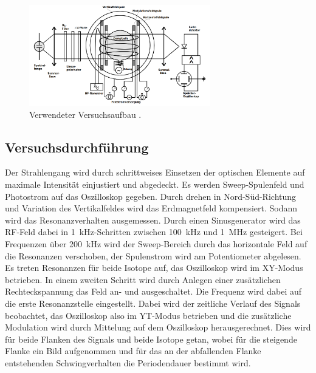 \begin{figure}[H]
  \centering
  \includegraphics[width=0.7\textwidth]{content/pics/Aufbau.png}
  \caption{Verwendeter Versuchsaufbau \cite{anleitung}.}
  \label{Dur:Abb1}
\end{figure}

\subsection{Versuchsdurchführung}
Der Strahlengang wird durch schrittweises Einsetzen der optischen Elemente auf
maximale Intensität einjustiert und abgedeckt.
Es werden Sweep-Spulenfeld und Photostrom auf das Oszilloskop gegeben.
Durch drehen in Nord-Süd-Richtung und Variation des Vertikalfeldes wird das Erdmagnetfeld
kompensiert.
Sodann wird das Resonanzverhalten ausgemessen.
Durch einen Sinusgenerator wird das RF-Feld dabei in \SI{1}{\kilo\hertz}-Schritten
zwischen \SI{100}{\kilo\hertz} und \SI{1}{\mega\hertz} gesteigert.
Bei Frequenzen über \SI{200}{\kilo\hertz} wird der Sweep-Bereich durch das horizontale
Feld auf die Resonanzen verschoben, der Spulenstrom wird am Potentiometer abgelesen.
Es treten Resonanzen für beide Isotope auf, das Oszilloskop wird im XY-Modus
betrieben.
In einem zweiten Schritt wird durch Anlegen einer zusätzlichen Rechteckspannung
das Feld an- und ausgeschaltet.
Die Frequenz wird dabei auf die erste Resonanzstelle eingestellt.
Dabei wird der zeitliche Verlauf des Signals beobachtet, das Oszilloskop also
im YT-Modus betrieben und die zusätzliche Modulation wird durch Mittelung
auf dem Oszilloskop herausgerechnet.
Dies wird für beide Flanken des Signals und beide Isotope getan, wobei für die
steigende Flanke ein Bild aufgenommen und für das an der abfallenden Flanke
entstehenden Schwingverhalten die Periodendauer bestimmt wird.
